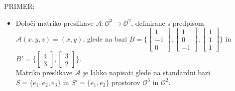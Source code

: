 \documentclass[a4paper,12pt]{article}
\newcommand{\A}{\mathcal{A}}
\newcommand{\OO}{\mathcal{O}}
\begin{document}
PRIMER:
\begin{itemize}
	\item Določi matriko preslikave $\A:\OO^3\to \OO^2$, definirane s predpisom $\A(x,y,z)=(x,y)$, glede na bazi 
	$B=
	\{
	\begin{bmatrix}
		1\\-1\\0
	\end{bmatrix},
	\begin{bmatrix}
		1\\0\\-1
	\end{bmatrix},
	\begin{bmatrix}
		1\\1\\1
	\end{bmatrix}
	\}$ in $B'=
	\{
	\begin{bmatrix}
		4\\3
	\end{bmatrix},
	\begin{bmatrix}
		3\\2
	\end{bmatrix}
	\}$. \\

	Matriko preslikave $\A$ je lahko napisati glede na standardni bazi $S=\{e_1,e_2,e_3\}$ in $S'=\{e_1,e_2\}$ prostorov $\OO^3$ in $\OO^2$. \\


\end{itemize}
\end{document}
